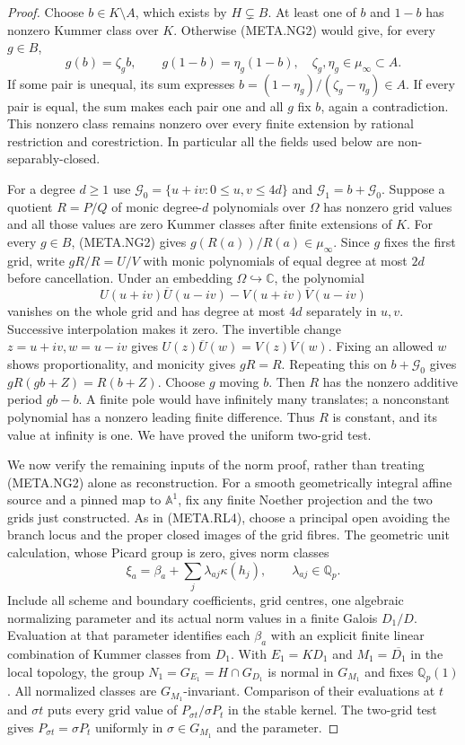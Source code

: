 \begin{proof}
Choose $b\in K\setminus A$, which exists by
$H\subsetneq B$.
At least one of $b$ and $1-b$ has nonzero
Kummer class over $K$.
Otherwise (META.NG2) would give, for every $g\in B$,
\[
        g(b)=\zeta_g b,\qquad
        g(1-b)=\eta_g(1-b),
                 \quad\zeta_g,\eta_g\in\mu_\infty\subset A.
\]
If some pair is unequal, its sum expresses
$b=(1-\eta_g)/(\zeta_g-\eta_g)\in A$.
If every pair is equal, the sum makes each
pair one and all $g$ fix $b$, again a contradiction.
This nonzero class remains nonzero over every
finite extension by rational restriction and
corestriction.  In particular all the fields
used below are non-separably-closed.

For a degree $d\ge1$ use
$\mathcal G_0=\{u+iv:0\le u,v\le4d\}$ and
$\mathcal G_1=b+\mathcal G_0$.
Suppose a quotient $R=P/Q$ of monic degree-$d$
polynomials over $\Omega$ has nonzero grid
values and all those values are zero Kummer
classes after finite extensions of $K$.
For every $g\in B$, (META.NG2) gives
$g(R(a))/R(a)\in\mu_\infty$.
Since $g$ fixes the first grid, write
$gR/R=U/V$ with monic polynomials of equal
degree at most $2d$ before cancellation.
Under an embedding $\Omega\hookrightarrow\mathbb C$,
the polynomial
\[
 U(u+iv)\overline U(u-iv)-V(u+iv)\overline V(u-iv)
\]
vanishes on the whole grid and has degree at
most $4d$ separately in $u,v$.
Successive interpolation makes it zero.
The invertible change $z=u+iv,w=u-iv$ gives
$U(z)\overline U(w)=V(z)\overline V(w)$.
Fixing an allowed $w$ shows proportionality,
and monicity gives $gR=R$.
Repeating this on $b+\mathcal G_0$ gives
$gR(gb+Z)=R(b+Z)$.
Choose $g$ moving $b$.
Then $R$ has the nonzero additive period $gb-b$.
A finite pole would have infinitely many
translates; a nonconstant polynomial has a
nonzero leading finite difference.
Thus $R$ is constant, and its value at infinity
is one.  We have proved the uniform two-grid test.

We now verify the remaining inputs of the
norm proof, rather than treating (META.NG2)
alone as reconstruction.
For a smooth geometrically integral affine
source and a pinned map to $\mathbb A^1$, fix
any finite Noether projection and the two
grids just constructed.
As in (META.RL4), choose a principal open
avoiding the branch locus and the proper
closed images of the grid fibres.
The geometric unit calculation, whose Picard
group is zero, gives norm classes
\[
                 \xi_a=\beta_a+
                       \sum_j\lambda_{aj}\kappa(h_j),
                  \qquad\lambda_{aj}\in\mathbb Q_p.
\]
Include all scheme and boundary coefficients,
grid centres, one algebraic normalizing parameter
and its actual norm values in a finite Galois
$D_1/D$.  Evaluation at that parameter identifies
each $\beta_a$ with an explicit finite linear
combination of Kummer classes from $D_1$.
With $E_1=KD_1$ and $M_1=\overline{D_1}$
in the local topology, the group
$N_1=G_{E_1}=H\cap G_{D_1}$ is normal in
$G_{M_1}$ and fixes $\mathbb Q_p(1)$.
All normalized classes are $G_{M_1}$-invariant.
Comparison of their evaluations at $t$ and
$\sigma t$ puts every grid value of
$P_{\sigma t}/\sigma P_t$ in the stable kernel.
The two-grid test gives
$P_{\sigma t}=\sigma P_t$ uniformly in
$\sigma\in G_{M_1}$ and the parameter.


\end{proof}

